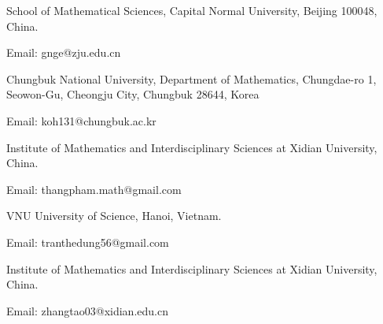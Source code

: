 \documentclass[11pt]{article}
\begin{document}
School of Mathematical Sciences, Capital Normal University, Beijing 100048, China. 

Email: gnge@zju.edu.cn

\vspace{0.5 cm}

Chungbuk National University, Department of Mathematics, Chungdae-ro 1, Seowon-Gu, Cheongju City, Chungbuk 28644, Korea

Email: koh131@chungbuk.ac.kr

\vspace{0.5 cm}

Institute of Mathematics and Interdisciplinary Sciences at Xidian University, China. 

Email: thangpham.math@gmail.com

\vspace{0.5 cm}

VNU University of Science, Hanoi, Vietnam.

Email: tranthedung56@gmail.com

\vspace{0.5 cm}

Institute of Mathematics and Interdisciplinary Sciences at Xidian University, China. 

Email: zhangtao03@xidian.edu.cn
\end{document}
